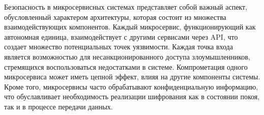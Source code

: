 

Безопасность в микросервисных системах представляет собой важный аспект, обусловленный характером архитектуры, которая состоит из множества взаимодействующих компонентов. Каждый микросервис, функционирующий как автономная единица, взаимодействует с другими сервисами через API, что создает множество потенциальных точек уязвимости. 
Каждая точка входа является возможностью для несанкционированного доступа злоумышленников, стремящихся воспользоваться недостатками в системе. Компрометация одного микросервиса может иметь цепной эффект, влияя на другие компоненты системы.
Кроме того, микросервисы часто обрабатывают конфиденциальную информацию, что обуславливает необходимость реализации шифрования как в состоянии покоя, так и в процессе передачи данных.~\cite{m_security}






